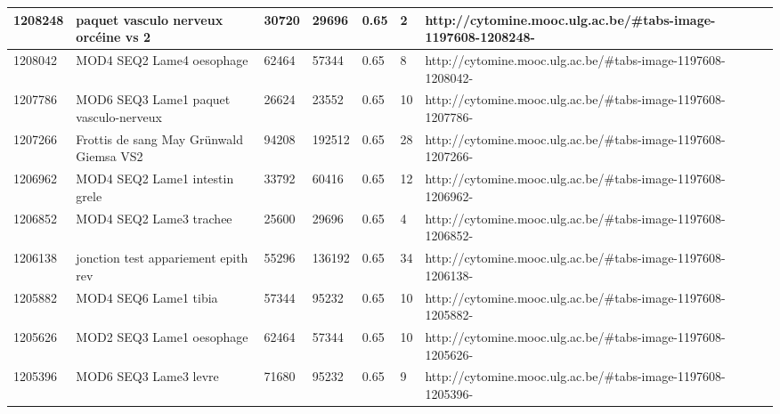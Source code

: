 \documentclass[a4paper,11pt]{report}
\numberwithin{figure}{chapter} %
\begin{document}
\begin{table}[]
{\begin{tabular}{|l|l|l|l|l|l|l|}
1208248  & paquet vasculo nerveux orc\'{e}ine vs 2                                                          & 30720  & 29696  & 0.65                  & 2           & http://cytomine.mooc.ulg.ac.be/\#tabs-image-1197608-1208248-  \\ \hline
1208042  & MOD4 SEQ2 Lame4 oesophage                                                                    & 62464  & 57344  & 0.65                  & 8           & http://cytomine.mooc.ulg.ac.be/\#tabs-image-1197608-1208042-  \\ \hline
1207786  & MOD6 SEQ3 Lame1 paquet vasculo-nerveux                                                       & 26624  & 23552  & 0.65                  & 10          & http://cytomine.mooc.ulg.ac.be/\#tabs-image-1197608-1207786-  \\ \hline
1207266  & Frottis de sang May Gr\"{u}nwald Giemsa VS2                                                      & 94208  & 192512 & 0.65                  & 28          & http://cytomine.mooc.ulg.ac.be/\#tabs-image-1197608-1207266-  \\ \hline
1206962  & MOD4 SEQ2 Lame1 intestin grele                                                               & 33792  & 60416  & 0.65                  & 12          & http://cytomine.mooc.ulg.ac.be/\#tabs-image-1197608-1206962-  \\ \hline
1206852  & MOD4 SEQ2 Lame3 trachee                                                                      & 25600  & 29696  & 0.65                  & 4           & http://cytomine.mooc.ulg.ac.be/\#tabs-image-1197608-1206852-  \\ \hline
1206138  & jonction test appariement epith rev                                                          & 55296  & 136192 & 0.65                  & 34          & http://cytomine.mooc.ulg.ac.be/\#tabs-image-1197608-1206138-  \\ \hline
1205882  & MOD4 SEQ6 Lame1 tibia                                                                        & 57344  & 95232  & 0.65                  & 10          & http://cytomine.mooc.ulg.ac.be/\#tabs-image-1197608-1205882-  \\ \hline
1205626  & MOD2 SEQ3 Lame1 oesophage                                                                    & 62464  & 57344  & 0.65                  & 10          & http://cytomine.mooc.ulg.ac.be/\#tabs-image-1197608-1205626-  \\ \hline
1205396  & MOD6 SEQ3 Lame3 levre                                                                        & 71680  & 95232  & 0.65                  & 9           & http://cytomine.mooc.ulg.ac.be/\#tabs-image-1197608-1205396-  \\ \hline

\end{tabular}}
\end{table}
\end{document}
